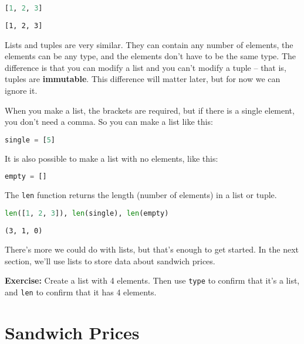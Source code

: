 \begin{lstlisting}[language=Python,style=source]
[1, 2, 3]
\end{lstlisting}

\begin{lstlisting}[style=output]
[1, 2, 3]
\end{lstlisting}

Lists and tuples are very similar. They can contain any number of
elements, the elements can be any type, and the elements don't have to
be the same type. The difference is that you can modify a list and you
can't modify a tuple -- that is, tuples are \textbf{immutable}. This
difference will matter later, but for now we can ignore it.

\pagebreak

When you make a list, the brackets are required, but if there is a
single element, you don't need a comma. So you can make a list like
this:

\begin{lstlisting}[language=Python,style=source]
single = [5]
\end{lstlisting}

It is also possible to make a list with no elements, like this:

\begin{lstlisting}[language=Python,style=source]
empty = []
\end{lstlisting}

The \passthrough{\lstinline!len!} function returns the length (number of
elements) in a list or tuple.

\begin{lstlisting}[language=Python,style=source]
len([1, 2, 3]), len(single), len(empty)
\end{lstlisting}

\begin{lstlisting}[style=output]
(3, 1, 0)
\end{lstlisting}

There's more we could do with lists, but that's enough to get started.
In the next section, we'll use lists to store data about sandwich
prices.

\textbf{Exercise:} Create a list with 4 elements. Then use
\passthrough{\lstinline!type!} to confirm that it's a list, and
\passthrough{\lstinline!len!} to confirm that it has 4 elements.

\section{Sandwich Prices}\label{sandwich-prices}

